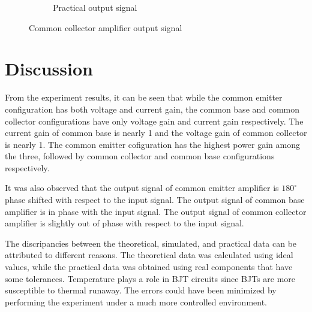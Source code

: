 \documentclass[12pt]{article}
\begin{document}
\begin{figure}[h!]
\begin{subfigure}{0.45\textwidth}
        \caption{Practical output signal}
        \label{fig:CC prac}
    \end{subfigure}
    \caption{Common collector amplifier output signal}
    \label{fig:CC signals}
\end{figure}

\section{Discussion}
From the experiment results, it can be seen that while the common emitter configuration has both voltage and current gain, the common base and common collector configurations have only voltage gain and current gain respectively. The current gain of common base is nearly 1 and the voltage gain of common collector is nearly 1. The common emitter cofiguration has the highest power gain among the three, followed by common collector and common base configurations respectively.

It was also observed that the output signal of common emitter amplifier is $180^{\circ}$ phase shifted with respect to the input signal. The output signal of common base amplifier is in phase with the input signal. The output signal of common collector amplifier is slightly out of phase with respect to the input signal.

The discripancies between the theoretical, simulated, and practical data can be attributed to different reasons. The theoretical data was calculated using ideal values, while the practical data was obtained using real components that have some tolerances. Temperature plays a role in BJT circuits since BJTs are more susceptible to thermal runaway. The errors could have been minimized by performing the experiment under a much more controlled environment.
\end{document}
